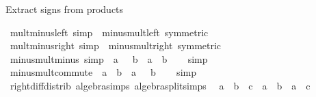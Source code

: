 \begin{isabellebody}
\endisatagproof
{\isafoldproof}%
%
\isadelimproof
%
\endisadelimproof
%
\begin{isamarkuptext}%
Extract signs from products%
\end{isamarkuptext}\isamarkuptrue%
\isamarkupfalse%
\ mult{\isacharunderscore}{\kern0pt}minus{\isacharunderscore}{\kern0pt}left\ {\isacharbrackleft}{\kern0pt}simp{\isacharbrackright}{\kern0pt}\ {\isacharequal}{\kern0pt}\ minus{\isacharunderscore}{\kern0pt}mult{\isacharunderscore}{\kern0pt}left\ {\isacharbrackleft}{\kern0pt}symmetric{\isacharbrackright}{\kern0pt}\isanewline
{}\isamarkupfalse%
\ mult{\isacharunderscore}{\kern0pt}minus{\isacharunderscore}{\kern0pt}right\ {\isacharbrackleft}{\kern0pt}simp{\isacharbrackright}{\kern0pt}\ {\isacharequal}{\kern0pt}\ minus{\isacharunderscore}{\kern0pt}mult{\isacharunderscore}{\kern0pt}right\ {\isacharbrackleft}{\kern0pt}symmetric{\isacharbrackright}{\kern0pt}\isanewline
\isanewline
{}\isamarkupfalse%
\ minus{\isacharunderscore}{\kern0pt}mult{\isacharunderscore}{\kern0pt}minus\ {\isacharbrackleft}{\kern0pt}simp{\isacharbrackright}{\kern0pt}{\isacharcolon}{\kern0pt}\ {\isachardoublequoteopen}{\isacharminus}{\kern0pt}\ a\ {\isacharasterisk}{\kern0pt}\ {\isacharminus}{\kern0pt}\ b\ {\isacharequal}{\kern0pt}\ a\ {\isacharasterisk}{\kern0pt}\ b{\isachardoublequoteclose}\isanewline
%
\isadelimproof
\ \ %
\endisadelimproof
%
\isatagproof
{}\isamarkupfalse%
\ simp%
\endisatagproof
{\isafoldproof}%
%
\isadelimproof
\isanewline
%
\endisadelimproof
\isanewline
{}\isamarkupfalse%
\ minus{\isacharunderscore}{\kern0pt}mult{\isacharunderscore}{\kern0pt}commute{\isacharcolon}{\kern0pt}\ {\isachardoublequoteopen}{\isacharminus}{\kern0pt}\ a\ {\isacharasterisk}{\kern0pt}\ b\ {\isacharequal}{\kern0pt}\ a\ {\isacharasterisk}{\kern0pt}\ {\isacharminus}{\kern0pt}\ b{\isachardoublequoteclose}\isanewline
%
\isadelimproof
\ \ %
\endisadelimproof
%
\isatagproof
{}\isamarkupfalse%
\ simp%
\endisatagproof
{\isafoldproof}%
%
\isadelimproof
\isanewline
%
\endisadelimproof
\isanewline
{}\isamarkupfalse%
\ right{\isacharunderscore}{\kern0pt}diff{\isacharunderscore}{\kern0pt}distrib\ {\isacharbrackleft}{\kern0pt}algebra{\isacharunderscore}{\kern0pt}simps{\isacharcomma}{\kern0pt}\ algebra{\isacharunderscore}{\kern0pt}split{\isacharunderscore}{\kern0pt}simps{\isacharbrackright}{\kern0pt}{\isacharcolon}{\kern0pt}\isanewline
\ \ {\isachardoublequoteopen}a\ {\isacharasterisk}{\kern0pt}\ {\isacharparenleft}{\kern0pt}b\ {\isacharminus}{\kern0pt}\ c{\isacharparenright}{\kern0pt}\ {\isacharequal}{\kern0pt}\ a\ {\isacharasterisk}{\kern0pt}\ b\ {\isacharminus}{\kern0pt}\ a\ {\isacharasterisk}{\kern0pt}\ c{\isachardoublequoteclose}\isanewline

\end{isabellebody}
